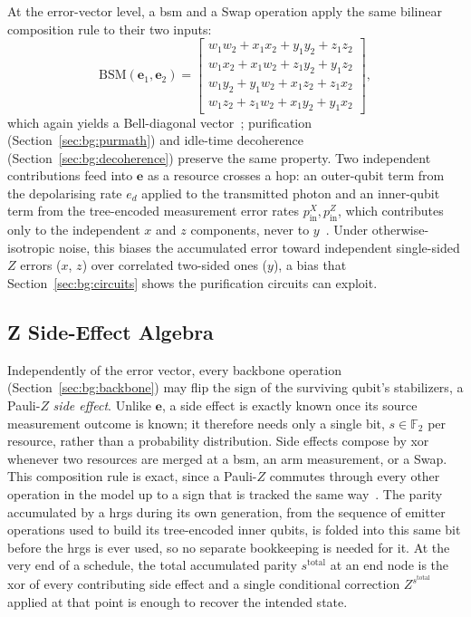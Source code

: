 At the error-vector level, a \Gls{bsm} and a Swap operation apply the same bilinear composition rule to their two inputs:
\begin{equation}
    \mathrm{BSM}(\mathbf{e}_1,\mathbf{e}_2) =
    \begin{bmatrix}
        w_1 w_2 + x_1 x_2 + y_1 y_2 + z_1 z_2 \\
        w_1 x_2 + x_1 w_2 + z_1 y_2 + y_1 z_2 \\
        w_1 y_2 + y_1 w_2 + x_1 z_2 + z_1 x_2 \\
        w_1 z_2 + z_1 w_2 + x_1 y_2 + y_1 x_2
    \end{bmatrix},
    \label{eq:bsmcompose}
\end{equation}
which again yields a Bell-diagonal vector~\cite{Benchasattabuse2025Integrating,Benchasattabuse2026Bridging}; purification (Section~\ref{sec:bg:purmath}) and idle-time decoherence (Section~\ref{sec:bg:decoherence}) preserve the same property. Two independent contributions feed into $\mathbf{e}$ as a resource crosses a hop: an outer-qubit term from the depolarising rate $e_d$ applied to the transmitted photon and an inner-qubit term from the tree-encoded measurement error rates $p^X_{\mathrm{in}}, p^Z_{\mathrm{in}}$, which contributes only to the independent $x$ and $z$ components, never to $y$~\cite{Benchasattabuse2026Bridging}. Under otherwise-isotropic noise, this biases the accumulated error toward independent single-sided $Z$ errors ($x$, $z$) over correlated two-sided ones ($y$), a bias that Section~\ref{sec:bg:circuits} shows the purification circuits can exploit.

\subsection{Z Side-Effect Algebra}
\label{sec:bg:sideffects}

Independently of the error vector, every backbone operation (Section~\ref{sec:bg:backbone}) may flip the sign of the surviving qubit's stabilizers, a Pauli-$Z$ \emph{side effect}. Unlike $\mathbf{e}$, a side effect is exactly known once its source measurement outcome is known; it therefore needs only a single bit, $s\in\mathbb{F}_2$ per resource, rather than a probability distribution. Side effects compose by \gls{xor} whenever two resources are merged at a \Gls{bsm}, an arm measurement, or a Swap. This composition rule is exact, since a Pauli-$Z$ commutes through every other operation in the model up to a sign that is tracked the same way~\cite{Benchasattabuse2026Bridging}. The parity accumulated by a \Gls{hrgs} during its own generation, from the sequence of emitter operations used to build its tree-encoded inner qubits, is folded into this same bit before the \Gls{hrgs} is ever used, so no separate bookkeeping is needed for it. At the very end of a schedule, the total accumulated parity $s^{\mathrm{total}}$ at an end node is the \Gls{xor} of every contributing side effect and a single conditional correction $Z^{s^{\mathrm{total}}}$ applied at that point is enough to recover the intended state.

